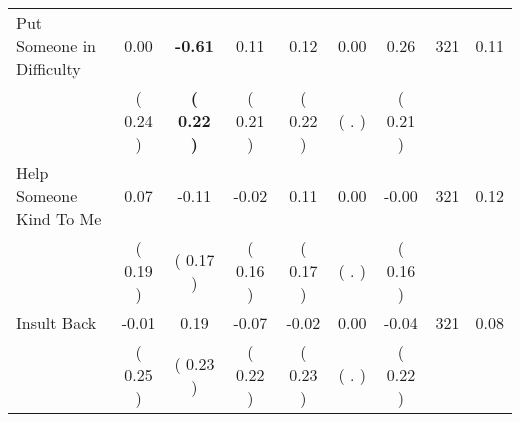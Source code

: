 \begin{tabular}{lcccccccc}
Put Someone in Difficulty &      0.00 & \textbf{    -0.61} &      0.11 &      0.12 &      0.00 &      0.26 & 321 &       0.11 \\ 
 & (     0.24 ) & \textbf{(     0.22 )} & (     0.21 ) & (     0.22 ) & (        . ) & (     0.21 ) & \\
Help Someone Kind To Me &      0.07 &     -0.11 &     -0.02 &      0.11 &      0.00 &     -0.00 & 321 &       0.12 \\ 
 & (     0.19 ) & (     0.17 ) & (     0.16 ) & (     0.17 ) & (        . ) & (     0.16 ) & \\
Insult Back &     -0.01 &      0.19 &     -0.07 &     -0.02 &      0.00 &     -0.04 & 321 &       0.08 \\ 
 & (     0.25 ) & (     0.23 ) & (     0.22 ) & (     0.23 ) & (        . ) & (     0.22 ) & \\
\bottomrule
\end{tabular}
